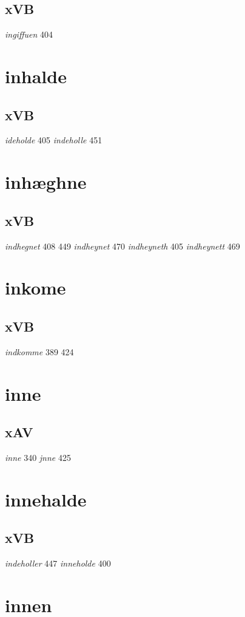 \documentclass[a4paper,twocolumn]{article}
\begin{document}
\subsection{xVB}
\label{sec:org34ba7ac}
\emph{ingiffuen} 404 
\section{inhalde}
\label{sec:orgd297250}
\subsection{xVB}
\label{sec:org6afe265}
\emph{ideholde} 405 \emph{indeholle} 451 
\section{inhæghne}
\label{sec:org6802113}
\subsection{xVB}
\label{sec:orga9746d4}
\emph{indhegnet} 408 449 \emph{indheynet} 470 \emph{indheyneth} 405 \emph{indheynett} 469 
\section{inkome}
\label{sec:org0601b32}
\subsection{xVB}
\label{sec:org08ddcf2}
\emph{indkomme} 389 424 
\section{inne}
\label{sec:org38ca49b}
\subsection{xAV}
\label{sec:orgc58ac56}
\emph{inne} 340 \emph{jnne} 425 
\section{innehalde}
\label{sec:org2599f5e}
\subsection{xVB}
\label{sec:org97a3151}
\emph{indeholler} 447 \emph{inneholde} 400 
\section{innen}
\label{sec:org63abd3b}
\end{document}
